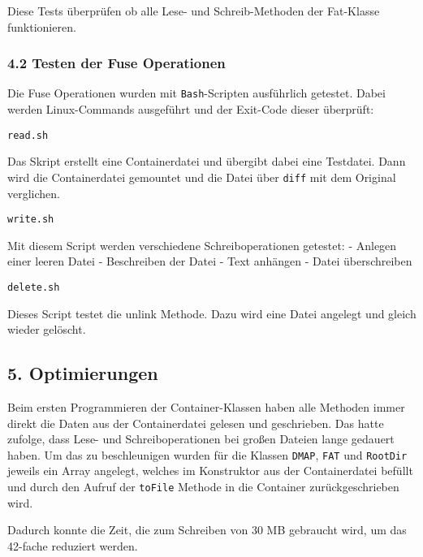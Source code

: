 \documentclass[]{article}
\newenvironment{Shaded}{}{}
\newcommand{\BuiltInTok}[1]{#1}
\newcommand{\KeywordTok}[1]{\textcolor[rgb]{0.00,0.44,0.13}{\textbf{#1}}}
\newcommand{\NormalTok}[1]{#1}
\newcommand{\OperatorTok}[1]{\textcolor[rgb]{0.40,0.40,0.40}{#1}}
\newcommand{\OtherTok}[1]{\textcolor[rgb]{0.00,0.44,0.13}{#1}}
\newcommand{\StringTok}[1]{\textcolor[rgb]{0.25,0.44,0.63}{#1}}
\newcommand{\VariableTok}[1]{\textcolor[rgb]{0.10,0.09,0.49}{#1}}
\begin{document}
Diese Tests überprüfen ob alle Lese- und Schreib-Methoden der Fat-Klasse
funktionieren.

\hypertarget{testen-der-fuse-operationen}{%
\subsubsection{4.2 Testen der Fuse
Operationen}\label{testen-der-fuse-operationen}}

Die Fuse Operationen wurden mit \texttt{Bash}-Scripten ausführlich
getestet. Dabei werden Linux-Commands ausgeführt und der Exit-Code
dieser überprüft:

\begin{Shaded}
\begin{framed}
\end{framed}
\end{Shaded}

\texttt{read.sh}

Das Skript erstellt eine Containerdatei und übergibt dabei eine
Testdatei. Dann wird die Containerdatei gemountet und die Datei über
\texttt{diff} mit dem Original verglichen.

\texttt{write.sh}

Mit diesem Script werden verschiedene Schreiboperationen getestet: -
Anlegen einer leeren Datei - Beschreiben der Datei - Text anhängen -
Datei überschreiben

\texttt{delete.sh}

Dieses Script testet die unlink Methode. Dazu wird eine Datei angelegt
und gleich wieder gelöscht.

\hypertarget{optimierungen}{%
\subsection{5. Optimierungen}\label{optimierungen}}

Beim ersten Programmieren der Container-Klassen haben alle Methoden
immer direkt die Daten aus der Containerdatei gelesen und geschrieben.
Das hatte zufolge, dass Lese- und Schreiboperationen bei großen Dateien
lange gedauert haben. Um das zu beschleunigen wurden für die Klassen
\texttt{DMAP}, \texttt{FAT} und \texttt{RootDir} jeweils ein Array
angelegt, welches im Konstruktor aus der Containerdatei befüllt und
durch den Aufruf der \texttt{toFile} Methode in die Container
zurückgeschrieben wird.

Dadurch konnte die Zeit, die zum Schreiben von 30 MB gebraucht wird, um
das 42-fache reduziert werden.
\end{document}
